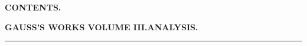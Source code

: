 \begingroup
\renewcommand{\arraystretch}{1.45}
\fancyhead[C]{}
\providecommand{\TStart}{\hspace*{.5em}}\providecommand{\TCont}{\hspace*{1em}}\providecommand{\TD}{\hspace{.3em}.\hspace{.3em}.}
\clearpage{}


\begin{center}
\textbf{CONTENTS.}\par
\medskip
\textbf{GAUSS’S WORKS VOLUME III.\quad ANALYSIS.}\par
\medskip
\rule{2em}{0.4pt}
\end{center}
\begingroup\small
\setlength{\tabcolsep}{0pt}
\setlength{\LTleft}{0pt}\setlength{\LTright}{0pt}
